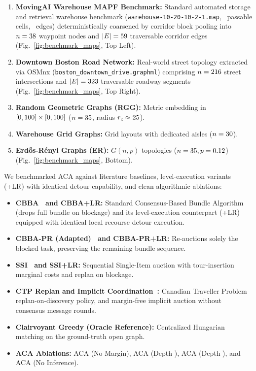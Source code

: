 \documentclass[lettersize,journal]{IEEEtran}
\begin{document}
\begin{enumerate}[leftmargin=*,itemsep=1pt,topsep=2pt,parsep=0pt]
    \item \textbf{MovingAI Warehouse MAPF Benchmark:} Standard automated storage and retrieval warehouse benchmark (\texttt{warehouse-10-20-10-2-1.map}, \aeMapMovingAiPassableCells\ passable cells, \aeMapMovingAiEdges\ edges) deterministically coarsened by corridor block pooling into $n = 38$ waypoint nodes and $|E| = 59$ traversable corridor edges (Fig.~\ref{fig:benchmark_maps}, Top Left).
    \item \textbf{Downtown Boston Road Network:} Real-world street topology extracted via OSMnx (\texttt{boston\_downtown\_drive.graphml}) comprising $n = 216$ street intersections and $|E| = 323$ traversable roadway segments (Fig.~\ref{fig:benchmark_maps}, Top Right).
    \item \textbf{Random Geometric Graphs (RGG):} Metric embedding in $[0, 100] \times [0, 100]$ ($n = 35$, radius $r_c \approx 25$).
    \item \textbf{Warehouse Grid Graphs:} Grid layouts with dedicated aisles ($n = 30$).
    \item \textbf{Erd\H{o}s-R\'enyi Graphs (ER):} $G(n, p)$ topologies ($n = 35, p = 0.12$) (Fig.~\ref{fig:benchmark_maps}, Bottom).
\end{enumerate}

We benchmarked ACA against literature baselines, level-execution variants (+LR) with identical detour capability, and clean algorithmic ablations:
\begin{itemize}[leftmargin=*,itemsep=1pt,topsep=2pt,parsep=0pt]
    \item \textbf{CBBA~\cite{choi2009cbba} and CBBA+LR:} Standard Consensus-Based Bundle Algorithm (drops full bundle on blockage) and its level-execution counterpart (+LR) equipped with identical local recourse detour execution.
    \item \textbf{CBBA-PR (Adapted)~\cite{buckman2019partial} and CBBA-PR+LR:} Re-auctions solely the blocked task, preserving the remaining bundle sequence.
    \item \textbf{SSI~\cite{koenig2006ssi} and SSI+LR:} Sequential Single-Item auction with tour-insertion marginal costs and replan on blockage.
    \item \textbf{CTP Replan and Implicit Coordination~\cite{alighanbari2005implicit}:} Canadian Traveller Problem replan-on-discovery policy, and margin-free implicit auction without consensus message rounds.
    \item \textbf{Clairvoyant Greedy (Oracle Reference):} Centralized Hungarian matching on the ground-truth open graph.
    \item \textbf{ACA Ablations:} ACA (No Margin), ACA (Depth \aeDepthZero), ACA (Depth \aeDepthTwo), and ACA (No Inference).
\end{itemize}
\end{document}
